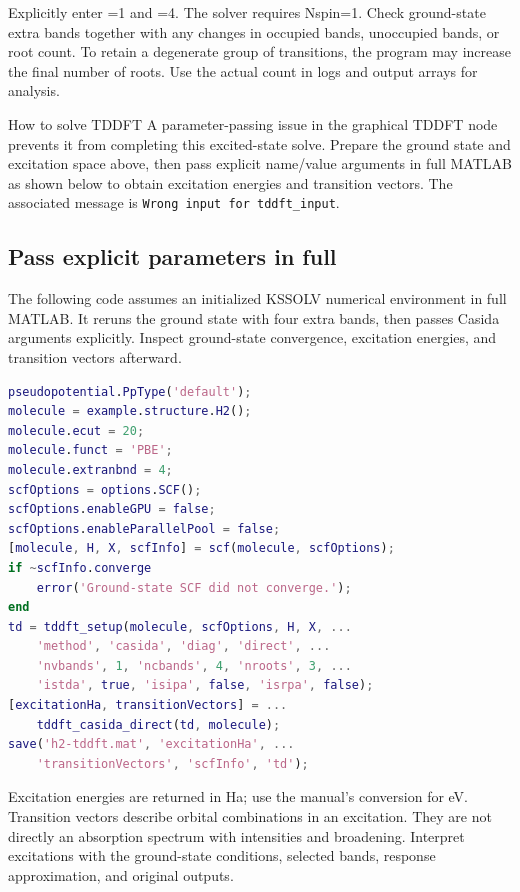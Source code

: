 Explicitly enter =1 and =4. The solver requires Nspin=1. Check ground-state extra bands together with any changes in occupied bands, unoccupied bands, or root count. To retain a degenerate group of transitions, the program may increase the final number of roots. Use the actual count in logs and output arrays for analysis.

\begin{notebox}{How to solve TDDFT}
A parameter-passing issue in the graphical TDDFT node prevents it from completing this excited-state solve. Prepare the ground state and excitation space above, then pass explicit name/value arguments in full MATLAB\regmark{} as shown below to obtain excitation energies and transition vectors. The associated message is \texttt{Wrong input for tddft\_input}.
\end{notebox}

\subsection{Pass explicit parameters in full \regmark{}}

The following code assumes an initialized KSSOLV numerical environment in full MATLAB\regmark{}. It reruns the ground state with four extra bands, then passes Casida arguments explicitly. Inspect ground-state convergence, excitation energies, and transition vectors afterward.

\noindent\begin{minipage}{\linewidth}
\begin{lstlisting}[language=Matlab]
pseudopotential.PpType('default');
molecule = example.structure.H2();
molecule.ecut = 20;
molecule.funct = 'PBE';
molecule.extranbnd = 4;
scfOptions = options.SCF();
scfOptions.enableGPU = false;
scfOptions.enableParallelPool = false;
[molecule, H, X, scfInfo] = scf(molecule, scfOptions);
if ~scfInfo.converge
    error('Ground-state SCF did not converge.');
end
td = tddft_setup(molecule, scfOptions, H, X, ...
    'method', 'casida', 'diag', 'direct', ...
    'nvbands', 1, 'ncbands', 4, 'nroots', 3, ...
    'istda', true, 'isipa', false, 'isrpa', false);
[excitationHa, transitionVectors] = ...
    tddft_casida_direct(td, molecule);
save('h2-tddft.mat', 'excitationHa', ...
    'transitionVectors', 'scfInfo', 'td');
\end{lstlisting}
\end{minipage}

Excitation energies are returned in Ha; use the manual's conversion for eV. Transition vectors describe orbital combinations in an excitation. They are not directly an absorption spectrum with intensities and broadening. Interpret excitations with the ground-state conditions, selected bands, response approximation, and original outputs.

